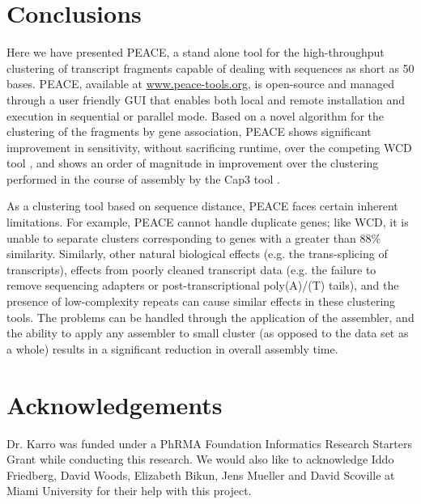 \documentclass[a4,center,fleqn]{NAR}
\newcommand{\peace} {{\small PEACE}}
\newcommand{\wcd} {{\small WCD}}
\newcommand{\capthree} {{\small Cap3}}
\begin{document}
\section{Conclusions}

Here we have presented \peace, a stand alone tool for the
high-throughput clustering of transcript fragments capable of dealing
with sequences as short as 50 bases.  \peace\/, available at
\href{http://www.peace-tools.org}{www.peace-tools.org}, is open-source
and managed through a user friendly GUI that enables both local and
remote installation and execution in sequential or parallel mode.
Based on a novel algorithm for the clustering of the fragments by gene
association, \peace\/ shows significant improvement in sensitivity,
without sacrificing runtime, over the competing \wcd\/ tool
\cite{Hazelhurst08a}, and shows an order of magnitude in improvement
over the clustering performed in the course of assembly by the
\capthree\/ tool \cite{Huang99}.

As a clustering tool based on sequence distance, \peace\/ faces
certain inherent limitations. For example, \peace\/ cannot handle
duplicate genes; like \wcd\/, it is unable to separate clusters
corresponding to genes with a greater than 88\% similarity.
Similarly, other natural biological effects (e.g. the trans-splicing of
transcripts), effects from poorly cleaned transcript data (e.g. the
failure to remove sequencing adapters or post-transcriptional
poly(A)/(T) tails), and the presence of low-complexity repeats can
cause similar effects in these clustering tools.  The problems can be
handled through the application of the assembler, and the ability to
apply any assembler to small cluster (as opposed to the data set as a
whole) results in a significant reduction in overall assembly time.

\section{Acknowledgements}

Dr. Karro was funded under a PhRMA Foundation Informatics Research
Starters Grant while conducting this research.  We would also like to
acknowledge Iddo Friedberg, David Woods, Elizabeth Bikun, Jens Mueller and David
Scoville at Miami University for their help with this project.

\vspace{3mm}


\end{document}
